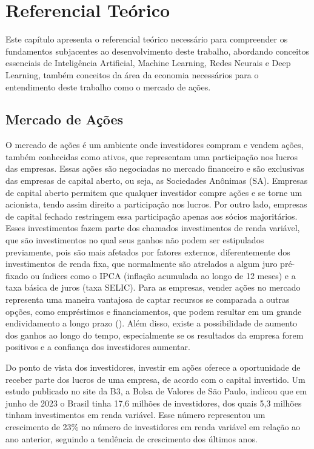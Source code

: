 \chapter{Referencial Teórico}
\label{ch:referencial_teorico}

Este capítulo apresenta o referencial teórico necessário para compreender os fundamentos subjacentes ao desenvolvimento deste trabalho, abordando conceitos essenciais de Inteligência Artificial, Machine Learning, Redes Neurais e Deep Learning, também conceitos da área da economia necessários para o entendimento deste trabalho como o mercado de ações.

\section{Mercado de Ações}

O mercado de ações é um ambiente onde investidores compram e vendem ações, também conhecidas como ativos, que representam uma participação nos lucros das empresas. Essas ações são negociadas no mercado financeiro e são exclusivas das empresas de capital aberto, ou seja, as Sociedades Anônimas (SA). Empresas de capital aberto permitem que qualquer investidor compre ações e se torne um acionista, tendo assim direito a participação nos lucros. Por outro lado, empresas de capital fechado restringem essa participação apenas aos sócios majoritários. Esses investimentos fazem parte dos chamados investimentos de renda variável, que são investimentos no qual seus ganhos não podem ser estipulados previamente, pois são mais afetados por fatores externos, diferentemente dos investimentos de renda fixa, que normalmente são atrelados a algum juro pré-fixado ou índices como o IPCA (inflação acumulada ao longo de 12 meses) e a taxa básica de juros (taxa SELIC). Para as empresas, vender ações no mercado representa uma maneira vantajosa de captar recursos se comparada a outras opções, como empréstimos e financiamentos, que podem resultar em um grande endividamento a longo prazo (\cite{teweles1998stock}). Além disso, existe a possibilidade de aumento dos ganhos ao longo do tempo, especialmente se os resultados da empresa forem positivos e a confiança dos investidores aumentar.

Do ponto de vista dos investidores, investir em ações oferece a oportunidade de receber parte dos lucros de uma empresa, de acordo com o capital investido. Um estudo publicado no site da B3, a Bolsa de Valores de São Paulo, indicou que em junho de 2023 o Brasil tinha 17,6 milhões de investidores, dos quais 5,3 milhões tinham investimentos em renda variável. Esse número representou um crescimento de 23\% no número de investidores em renda variável em relação ao ano anterior, seguindo a tendência de crescimento dos últimos anos.

